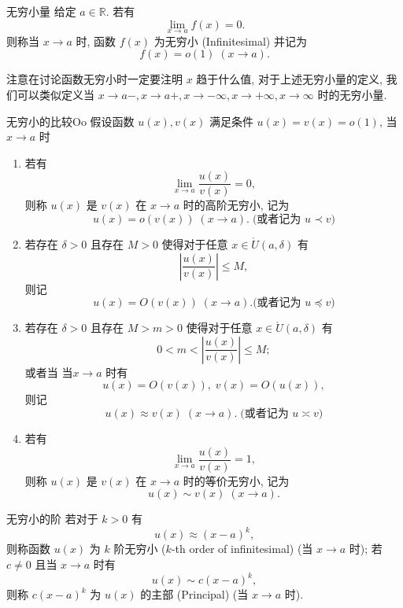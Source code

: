 \documentclass[cn,toc=twocol]{elegantbook}
\newcommand{\ITEMS}{\begin{enumerate}}
\newcommand{\ITEME}{\end{enumerate}}
\newcommand{\R}{\mathbb{R}}
\begin{document}
\begin{definition}{无穷小量}
	给定 $a \in \R$. 若有
	\[
		\lim_{x \to a} f(x) = 0.
	\]
	则称当 $x \to a$ 时, 函数 $f(x)$ 为无穷小 (Infinitesimal) 并记为
	\[
		 f(x) = o(1) \; (x \to a).
	\]
\end{definition}
\begin{remark}
	注意在讨论函数无穷小时一定要注明 $x$ 趋于什么值, 对于上述无穷小量的定义, 我们可以类似定义当 $x \to a-, x \to a+, x \to -\infty, x \to +\infty, x \to \infty$ 时的无穷小量.
\end{remark}

\begin{definition}{无穷小的比较}{Oo}
	假设函数 $u(x), v(x)$ 满足条件 $u(x) = v(x) = o(1)$, 当 $x \to a$ 时
	\ITEMS
		\item 若有
		\[
			\lim_{x \to a} \frac{u(x)}{v(x)} = 0,
		\]
		则称 $u(x)$ 是 $v(x)$ 在 $x \to a$ 时的高阶无穷小, 记为
		\[
			u(x) = o(v(x)) \; (x \to a).\; \text{(或者记为 $u \prec v$)}
		\]
		
		\item  若存在 $\delta>0$ 且存在 $M > 0$ 使得对于任意 $x \in \mathring{U}(a,\delta)$ 有
		\[
			\left\lvert \frac{u(x)}{v(x)} \right\rvert \le M,
		\]
		则记
		\[
			u(x) = O(v(x)) \; (x \to a). \text{(或者记为 $u \preccurlyeq v$)}
		\]
		
		\item  若存在 $\delta>0$ 且存在 $M > m > 0$ 使得对于任意 $x \in \mathring{U}(a,\delta)$ 有
		\[
			0 < m < \left\lvert \frac{u(x)}{v(x)} \right\rvert \le M;
		\]
		或者当 $当x \to a$ 时有
		\[
			u(x) = O(v(x)),\; v(x) = O(u(x)),
		\]
		则记
		\[
			u(x) \approx v(x) \; (x \to a).\; \text{(或者记为 $u \asymp v$)}
		\]
		
		\item 若有
		\[
			\lim_{x \to a} \frac{u(x)}{v(x)} = 1,
		\]
		则称 $u(x)$ 是 $v(x)$ 在 $x \to a$ 时的等价无穷小, 记为
		\[
			u(x) \sim v(x) \; (x \to a).
		\]
	\ITEME
\end{definition}

\begin{definition}{无穷小的阶}
若对于 $k > 0$ 有
\[
	u(x) \approx (x - a)^k,
\]
则称函数 $u(x)$ 为 $k$ 阶无穷小 ($k$-th order of infinitesimal) (当 $x \to a$ 时); 
若 $c \neq 0$ 且当 $x \to a$ 时有
\[
	u(x) \sim c(x - a)^k,
\]
则称 $c(x - a)^k$ 为 $u(x)$ 的主部 (Principal) (当 $x \to a$ 时).
\end{definition}
\end{document}
